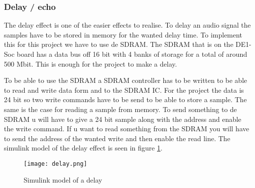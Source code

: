 \subsubsection{Delay / echo}
The delay effect is one of the easier effects to realise. To delay an audio signal the samples have to be stored in memory for the wanted delay time. To implement this for this project we have to use de SDRAM. The SDRAM that is on the DE1-Soc board has a data bus off 16 bit with 4 banks of storage for a total of around 500 Mbit. This is enough for the project to make a delay.
\par
\noindent To be able to use the SDRAM a SDRAM controller has to be written to be able to read and write data form and to the SDRAM IC. For the  project the data is 24 bit so two write commands have to be send to be able to store a sample. The same is the case for reading a sample from memory. To send something to de SDRAM u will have to give a 24 bit sample along with the address and enable the write command. If u want to read something from the SDRAM you will have to send the address of the wanted write and then enable the read line. 
The simulink model of the delay effect is seen in figure \ref{fig:delaysimulink}.

\begin{figure}[ht]
    \centering
    \texttt{[image: delay.png]}
    \caption{Simulink model of a delay}
    \label{fig:delaysimulink}
\end{figure}

